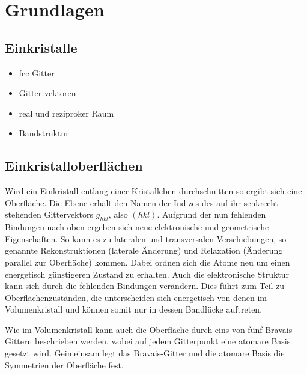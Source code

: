 \chapter{Grundlagen}
    \section{Einkristalle}
        \begin{itemize}
            \item fcc Gitter
            \item Gitter vektoren
            \item real und reziproker Raum
            \item Bandstruktur
        \end{itemize}

    \section{Einkristalloberflächen}
        Wird ein Einkristall entlang einer Kristalleben durchschnitten so ergibt sich eine Oberfläche.
        Die Ebene erhält den Namen der Indizes des auf ihr senkrecht stehenden Gittervektors $g_{hkl}$, also $(hkl)$.
        Aufgrund der nun fehlenden Bindungen nach oben ergeben sich neue elektronische und geometrische Eigenschaften.
        So kann es zu lateralen und transversalen Verschiebungen, so genannte Rekonstruktionen (laterale Änderung) und Relaxation (Änderung parallel zur Oberfläche) kommen.
        Dabei ordnen sich die Atome neu um einen energetisch günstigeren Zustand zu erhalten.
        Auch die elektronische Struktur kann sich durch die fehlenden Bindungen verändern.
        Dies führt zum Teil zu Oberflächenzuständen, die unterscheiden sich energetisch von denen im Volumenkristall und können somit nur in dessen Bandlücke auftreten.

        Wie im Volumenkristall kann auch die Oberfläche durch eins von fünf Bravais-Gittern beschrieben werden, wobei auf jedem Gitterpunkt eine atomare Basis gesetzt wird.
        Geimeinsam legt das Bravais-Gitter und die atomare Basis die Symmetrien der Oberfläche fest.


